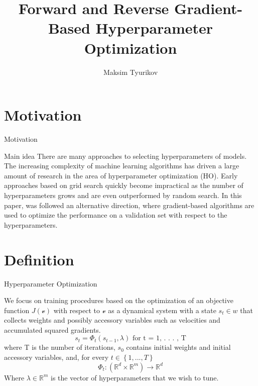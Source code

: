 \documentclass{beamer}
\title{Forward and Reverse Gradient-Based Hyperparameter Optimization}
\author{Maksim Tyurikov}
\institute{MIPT, 2023}
\begin{document}
\begin{frame}
    \titlepage
\end{frame}


\begin{frame}
    \tableofcontents
\end{frame}


\section{Motivation}
\begin{frame}{Motivation}
    \begin{block}{Main idea}
        There are many approaches to selecting hyperparameters of models.
        The increasing complexity of machine learning algorithms
        has driven a large amount of research in the area of hyperparameter optimization (HO).
        Early approaches based on grid search quickly become impractical as the number of hyperparameters grows and are even outperformed by random search. In this paper, was followed an alternative direction, where gradient-based algorithms are used to optimize the performance on a validation set with respect to the hyperparameters.
    \end{block} 
\end{frame}

\section{Definition}
\begin{frame}{Hyperparameter Optimization}
    \begin{block}{}
        We focus on training procedures based on the optimization of an objective function $J(\mathcal{v})$ with respect to $\mathcal{v}$  as a dynamical system with a state $s_{t} \in w$ that collects weights and possibly accessory variables such as velocities and accumulated squared gradients.
        \begin{equation}
            s_{t} = \Phi_{t}(s_{t-1}, \lambda) \text{ for t = 1, . . . , T}
        \end{equation}
        where T is the number of iterations, $s_{0}$ contains initial
        weights and initial accessory variables, and, for every $t \in {\left\{  1, . . . , T\right\}}$
        \begin{equation}
            \Phi_{t} : (\mathbb{R}^{d}  \times  \mathbb{R}^{m}) \to \mathbb{R}^{d}
        \end{equation}
        Where $\lambda \in \mathbb{R}^{m}$ is the vector of hyperparameters that we wish to tune.
    \end{block}
\end{frame}
\end{document}
